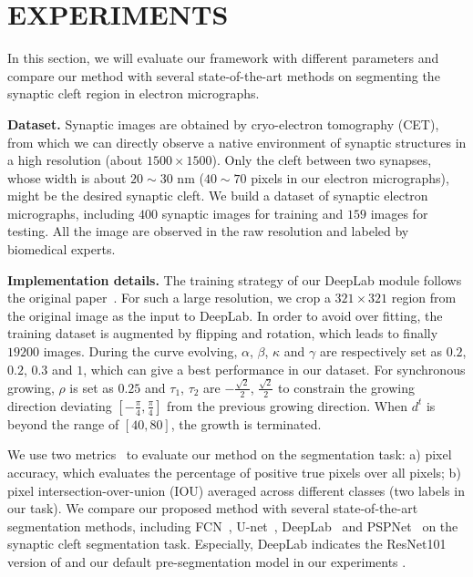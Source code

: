 \section{EXPERIMENTS}
\label{sec:experiments}
In this section, we will evaluate our framework with different parameters and compare our method with several state-of-the-art methods on segmenting the synaptic cleft region in electron micrographs.

\noindent\textbf{Dataset.}
Synaptic images are obtained by cryo-electron tomography (CET), from which we can directly observe a native environment of synaptic structures in a high resolution (about $1500\times 1500$).
%
Only the cleft between two synapses, whose width is about $20\sim30$ nm ($40\sim70$ pixels in our electron micrographs), might be the desired synaptic cleft.
%
We build a dataset of synaptic electron micrographs, including $400$ synaptic images for training and $159$ images for testing.
%
All the image are observed in the raw resolution and labeled by biomedical experts.

\noindent\textbf{Implementation details.}
The training strategy of our DeepLab module follows the original paper~\cite{Chen2016a}.
For such a large resolution, we crop a $321\times 321$ region from the original image as the input to DeepLab.
In order to avoid over fitting, the training dataset is augmented by flipping and rotation, which leads to finally $19200$ images.
%
During the curve evolving, $\alpha$, $\beta$, $\kappa$ and $\gamma$ are respectively set as $0.2$, $0.2$, $0.3$ and $1$, which can give a best performance in our dataset.
For synchronous growing, $\rho$ is set as $0.25$ and $\tau_1$, $\tau_2$ are $-\frac{\sqrt{2}}{2}$, $\frac{\sqrt{2}}{2}$ to constrain the growing direction deviating $[-\frac{\pi}{4},\frac{\pi}{4}]$ from the previous growing direction.
When $d^{t}$ is beyond the range of $[40,80]$, the growth is terminated.




We use two metrics~\cite{Cheng2017} to evaluate our method on the segmentation task:
a) pixel accuracy, which evaluates the percentage of positive true pixels over all pixels;
b) pixel intersection-over-union (IOU) averaged across different classes (two labels in our task).
%
We compare our proposed method with several state-of-the-art segmentation methods, including FCN~\cite{Long2015}, U-net~\cite{Ronneberger2015}, DeepLab~\cite{Chen2016a} and PSPNet~\cite{Zhao2016} on the synaptic cleft segmentation task.
Especially, DeepLab indicates the ResNet101 version of \cite{Chen2016a} and our default pre-segmentation model in our experiments .


